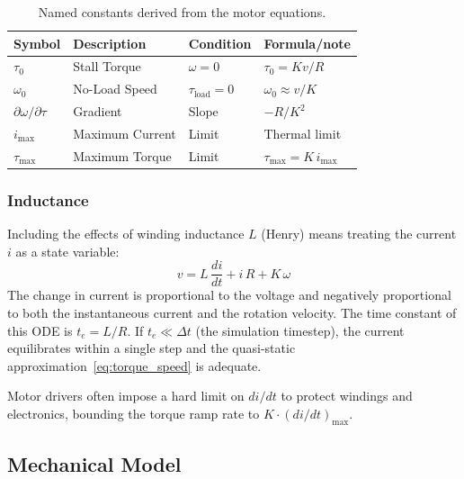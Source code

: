 \documentclass[10pt, a4paper, twocolumn]{article}
\begin{document}
\begin{table}[H]
\centering
\footnotesize
\setlength{\tabcolsep}{3pt}
\renewcommand{\arraystretch}{1.2}
\begin{tabular}{@{}llll@{}}
\toprule
Symbol & Description & Condition & Formula/note\\
\midrule
$\tau_0$ & Stall Torque & $\omega=0$ & $\tau_0 = Kv / R$ \\
$\omega_0$ & No-Load Speed & $\tau_{\text{load}}=0$ &
  $\omega_0 \approx v / K$ \\
$\partial\omega / \partial\tau$ & Gradient & Slope &
  $-R/K^2$ \\
$i_{\max}$ & Maximum Current & Limit & Thermal limit \\
$\tau_{\max}$ & Maximum Torque & Limit & $\tau_{\max} = K \, i_{\max}$ \\
\bottomrule
\end{tabular}
\caption{Named constants derived from the motor equations.}
\label{tab:electromech_constants}
\end{table}

\subsubsection{Inductance}
\label{sec:inductance}

Including the effects of winding inductance $L$ (Henry) means treating the current $i$ as a state variable:
\begin{equation}
  v = L \, \frac{di}{dt} + i \, R + K \, \omega
  \label{eq:inductance}
\end{equation}
The change in current is proportional to the voltage and negatively proportional to both the instantaneous current and the rotation velocity. The time constant of this ODE is $t_e = L/R$. If $t_e \ll \Delta t$ (the simulation timestep), the current equilibrates within a single step and the quasi-static approximation~\eqref{eq:torque_speed} is adequate.

Motor drivers often impose a hard limit on $di/dt$ to protect windings and electronics, bounding the torque ramp rate to $K \cdot (di/dt)_{\max}$.

\subsection{Mechanical Model}
\label{sec:mechanical}
\end{document}
